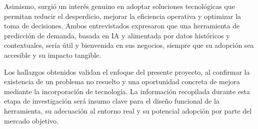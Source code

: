 \indent Asimismo, surgió un interés genuino en adoptar soluciones tecnológicas que permitan reducir el desperdicio, mejorar la eficiencia operativa y optimizar la toma de decisiones. Ambos entrevistados expresaron que una herramienta de predicción de demanda, basada en IA y alimentada por datos históricos y contextuales, sería útil y bienvenida en sus negocios, siempre que su adopción sea accesible y su impacto tangible.

\indent Los hallazgos obtenidos validan el enfoque del presente proyecto, al confirmar la existencia de un problema no resuelto y una oportunidad concreta de mejora mediante la incorporación de tecnología. La información recopilada durante esta etapa de investigación será insumo clave para el diseño funcional de la herramienta, su adecuación al entorno real y su potencial adopción por parte del mercado objetivo.






